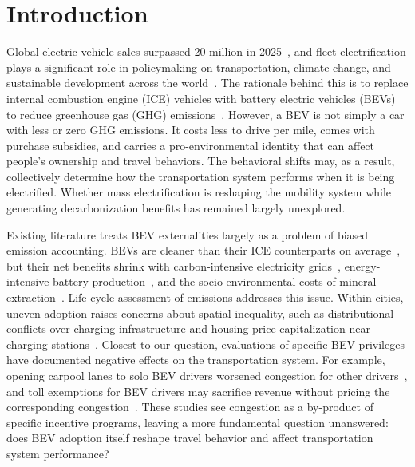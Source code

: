 \documentclass[11pt, letterpaper]{article}
\begin{document}
\newpage
{}
\setcounter{page}{1}
\section{Introduction}\label{sec:intro}
Global electric vehicle sales surpassed 20 million in 2025~\citep{IEA2026}, and fleet electrification plays a significant role in policymaking on transportation, climate change, and sustainable development across the world~\citep{IPCC2022SPM, UN2015}.
The rationale behind this is to replace internal combustion engine (ICE) vehicles with battery electric vehicles (BEVs) to reduce greenhouse gas (GHG) emissions~\citep{Ma2026, Ryghaug2023, Woody2023, Milovanoff2020}.
However, a BEV is not simply a car with less or zero GHG emissions.
It costs less to drive per mile, comes with purchase subsidies, and carries a pro-environmental identity that can affect people's ownership and travel behaviors.
The behavioral shifts may, as a result, collectively determine how the transportation system performs when it is being electrified.
Whether mass electrification is reshaping the mobility system while generating decarbonization benefits has remained largely unexplored.

Existing literature treats BEV externalities largely as a problem of biased emission accounting.
BEVs are cleaner than their ICE counterparts on average~\citep{Ren2023, Hawkins2013}, but their net benefits shrink with carbon-intensive electricity grids~\citep{Holland2020, Choi2018, Holland2016, Zivin2014}, energy-intensive battery production~\citep{Zhao2021, Tessum2014, Nordelof2014}, and the socio-environmental costs of mineral extraction~\citep{Niarchos2026, Kelly2021, Sovacool2019}.
Life-cycle assessment of emissions addresses this issue.
Within cities, uneven adoption raises concerns about spatial inequality, such as distributional conflicts over charging infrastructure and housing price capitalization near charging stations~\citep{Lou2024, Zheng2024, Liang2023, Yang2023, Liang2019}.
Closest to our question, evaluations of specific BEV privileges have documented negative effects on the transportation system.
For example, opening carpool lanes to solo BEV drivers worsened congestion for other drivers~\citep{Bento2014}, and toll exemptions for BEV drivers may sacrifice revenue without pricing the corresponding congestion~\citep{Bjerkan2016, Aasness2015}.
These studies see congestion as a by-product of specific incentive programs, leaving a more fundamental question unanswered: does BEV adoption itself reshape travel behavior and affect transportation system performance?
\end{document}
